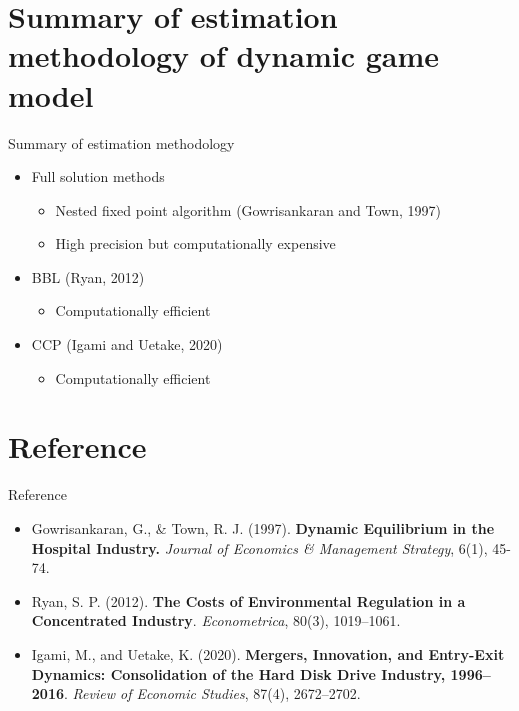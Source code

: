 \documentclass[aspectratio=169]{beamer}  %
\begin{document}
\section{Summary of estimation methodology of dynamic game model}
\begin{frame}{Summary of estimation methodology}
    \begin{itemize}
        \item Full solution methods 
        \begin{itemize}
            \item Nested fixed point algorithm (Gowrisankaran and Town, 1997)
            \item High precision but computationally expensive
        \end{itemize}
        \item BBL (Ryan, 2012)
        \begin{itemize}
            \item Computationally efficient
        \end{itemize}
        
        
        \item CCP (Igami and Uetake, 2020)
        \begin{itemize}
            \item Computationally efficient
        \end{itemize}
    \end{itemize}
\end{frame}

\section{Reference}
\begin{frame}{Reference}
    \begin{itemize}

    \item Gowrisankaran, G., \& Town, R. J. (1997). \textbf{Dynamic Equilibrium in the Hospital Industry.} \emph{Journal of Economics \& Management Strategy}, 6(1), 45-74.

    \item Ryan, S. P. (2012).
    \textbf{The Costs of Environmental Regulation in a Concentrated Industry}.
    \emph{Econometrica}, 80(3), 1019–1061.

    \item Igami, M., and Uetake, K. (2020).
    \textbf{Mergers, Innovation, and Entry-Exit Dynamics: Consolidation of the Hard Disk Drive Industry, 1996–2016}.
    \emph{Review of Economic Studies}, 87(4), 2672–2702.
      
    \end{itemize}
\end{frame}
\end{document}
